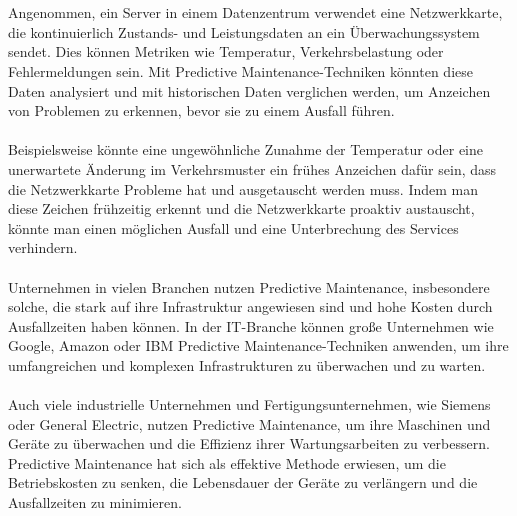 \\\\
Angenommen, ein Server in einem Datenzentrum verwendet eine Netzwerkkarte, die kontinuierlich Zustands- und Leistungsdaten an ein Überwachungssystem sendet. Dies können Metriken wie Temperatur, Verkehrsbelastung oder Fehlermeldungen sein. Mit Predictive Maintenance-Techniken könnten diese Daten analysiert und mit historischen Daten verglichen werden, um Anzeichen von Problemen zu erkennen, bevor sie zu einem Ausfall führen.
\\\\
Beispielsweise könnte eine ungewöhnliche Zunahme der Temperatur oder eine unerwartete Änderung im Verkehrsmuster ein frühes Anzeichen dafür sein, dass die Netzwerkkarte Probleme hat und ausgetauscht werden muss. Indem man diese Zeichen frühzeitig erkennt und die Netzwerkkarte proaktiv austauscht, könnte man einen möglichen Ausfall und eine Unterbrechung des Services verhindern.
\\\\
Unternehmen in vielen Branchen nutzen Predictive Maintenance, insbesondere solche, die stark auf ihre Infrastruktur angewiesen sind und hohe Kosten durch Ausfallzeiten haben können. In der IT-Branche können große Unternehmen wie Google, Amazon oder IBM Predictive Maintenance-Techniken anwenden, um ihre umfangreichen und komplexen Infrastrukturen zu überwachen und zu warten.
\\\\
Auch viele industrielle Unternehmen und Fertigungsunternehmen, wie Siemens oder General Electric, nutzen Predictive Maintenance, um ihre Maschinen und Geräte zu überwachen und die Effizienz ihrer Wartungsarbeiten zu verbessern. Predictive Maintenance hat sich als effektive Methode erwiesen, um die Betriebskosten zu senken, die Lebensdauer der Geräte zu verlängern und die Ausfallzeiten zu minimieren.

